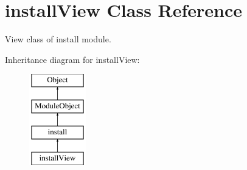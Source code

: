\hypertarget{classinstallView}{\section{install\-View Class Reference}
\label{classinstallView}
}


View class of install module.  


Inheritance diagram for install\-View\-:\begin{figure}[H]
\begin{center}
\leavevmode
\includegraphics[height=4.000000cm]{classinstallView}
\end{center}
\end{figure}
